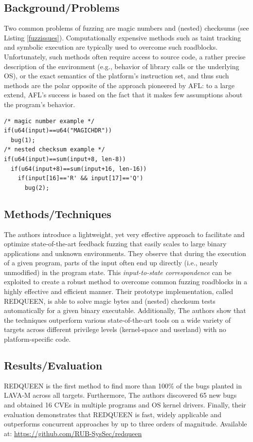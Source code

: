 \subsection{Background/Problems}
Two common problems of fuzzing are magic numbers and (nested) checksums (see Listing \ref{fuzzissues}). Computationally expensive methods such as taint tracking and symbolic execution are typically used to overcome such roadblocks. Unfortunately, such methods often require access to source code, a rather precise description of the environment (e.g., behavior of library calls or the underlying OS), or the exact semantics of the platform's instruction set, and thus such methods are the polar opposite of the approach pioneered by AFL: to a large extend, AFL's success is based on the fact that it makes few assumptions about the program's behavior.
\begin{lstlisting}[label=fuzzissues,language={[ANSI]C}, caption={Roadblocks for feedback-driven fuzzing.}]
/* magic number example */
if(u64(input)==u64("MAGICHDR"))
  bug(1);
/* nested checksum example */
if(u64(input)==sum(input+8, len-8))
  if(u64(input+8)==sum(input+16, len-16))
    if(input[16]=='R' && input[17]=='Q')
      bug(2);
\end{lstlisting}

\subsection{Methods/Techniques}
The authors introduce a lightweight, yet very effective approach to facilitate and optimize state-of-the-art feedback fuzzing that easily scales to large binary applications and unknown environments. They observe that during the execution of a given program, parts of the input often end up directly (i.e., nearly unmodified) in the program state. This \emph{input-to-state correspondence} can be exploited to create a robust method to overcome common fuzzing roadblocks in a highly effective and efficient manner.  Their prototype implementation, called REDQUEEN, is able to solve magic bytes and (nested) checksum tests automatically for a given binary executable. Additionally, The authors show that the techniques outperform various state-of-the-art tools on a wide variety of targets across different privilege levels (kernel-space and userland) with no platform-specific code.
\subsection{Results/Evaluation}
REDQUEEN is the first method to find more than 100\% of the bugs planted in LAVA-M across all targets. Furthermore, The authors discovered 65 new bugs and obtained 16 CVEs in multiple programs and OS kernel drivers. Finally, their evaluation demonstrates that REDQUEEN is fast, widely applicable and outperforms concurrent approaches by up to three orders of magnitude. Available at: \url{https://github.com/RUB-SysSec/redqueen}
